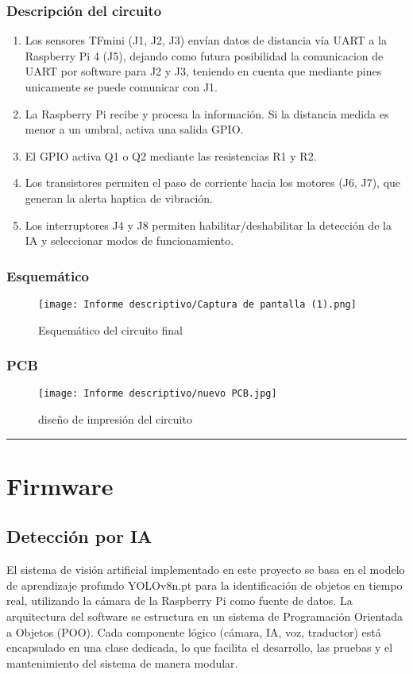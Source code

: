 \documentclass[12pt,a4paper]{article}
\newcommand{\separador}{\vspace{0.5cm}\noindent\rule{\linewidth}{0.5pt}\vspace{0.5cm}}
\begin{document}
\subsubsection{Descripción del circuito}
\begin{enumerate}
    \item Los sensores TFmini (J1, J2, J3) envían datos de distancia vía UART a la Raspberry Pi 4 (J5), dejando como futura posibilidad la comunicacion de UART por software para J2 y J3, teniendo en cuenta que mediante pines unicamente se puede comunicar con J1.
    \item La Raspberry Pi recibe y procesa la información. Si la distancia medida es menor a un umbral, activa una salida GPIO.
    \item El GPIO activa Q1 o Q2 mediante las resistencias R1 y R2.
    \item Los transistores permiten el paso de corriente hacia los motores (J6, J7), que generan la alerta haptica de vibración.
    \item Los interruptores J4 y J8 permiten habilitar/deshabilitar la detección de la IA y seleccionar modos de funcionamiento.
\end{enumerate}

\subsubsection{Esquemático}

\begin{figure}[H]
    \centering
\texttt{[image: Informe descriptivo/Captura de pantalla (1).png]}
\caption{Esquemático del circuito final}
\end{figure}


\subsubsection{PCB}

\begin{figure}[H]
    \centering
\texttt{[image: Informe descriptivo/nuevo PCB.jpg]}
\caption{diseño de impresión del circuito}
\end{figure}

\separador

\section{Firmware} 

\subsection{Detección por IA}
El sistema de visión artificial implementado en este proyecto se basa en el modelo de aprendizaje profundo YOLOv8n.pt para la identificación de objetos en tiempo real, utilizando la cámara de la Raspberry Pi como fuente de datos. La arquitectura del software se estructura en un sistema de Programación Orientada a Objetos (POO). Cada componente lógico (cámara, IA, voz, traductor) está encapsulado en una clase dedicada, lo que facilita el desarrollo, las pruebas y el mantenimiento del sistema de manera modular.
\end{document}
